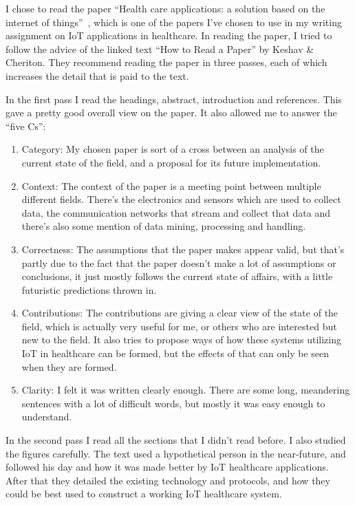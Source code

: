 I chose to read the paper ``Health care applications: a solution based on the
internet of things''~\cite{Bui2011}, which is one of the papers I've chosen to
use in my writing assignment on IoT applications in healthcare. In reading the
paper, I tried to follow the advice of the linked text ``How to Read a Paper''
by Keshav \& Cheriton. They recommend reading the paper in three passes, each
of which increases the detail that is paid to the text.

In the first pass I read the headings, abstract, introduction and references.
This gave a pretty good overall view on the paper. It also allowed me to answer
the ``five Cs'':

\begin{enumerate}
  \item Category: My chosen paper is sort of a cross between an analysis of the
    current state of the field, and a proposal for its future implementation.

  \item Context: The context of the paper is a meeting point between multiple
    different fields. There's the electronics and sensors which are used to
    collect data, the communication networks that stream and collect that
    data and there's also some mention of data mining, processing and handling.

  \item Correctness: The assumptions that the paper makes appear valid, but
    that's partly due to the fact that the paper doesn't make a lot of
    assumptions or conclusions, it just mostly follows the current state of
    affairs, with a little futuristic predictions thrown in.

  \item Contributions: The contributions are giving a clear view of the state
    of the field, which is actually very useful for me, or others who are
    interested but new to the field. It also tries to propose ways of how these
    systems utilizing IoT in healthcare can be formed, but the effects of that
    can only be seen when they are formed.

  \item Clarity: I felt it was written clearly enough. There are some long,
    meandering sentences with a lot of difficult words, but mostly it was easy
    enough to understand.

\end{enumerate}

In the second pass I read all the sections that I didn't read before. I also
studied the figures carefully. The text used a hypothetical person in the
near-future, and followed his day and how it was made better by IoT healthcare
applications. After that they detailed the existing technology and protocols,
and how they could be best used to construct a working IoT healthcare system.

